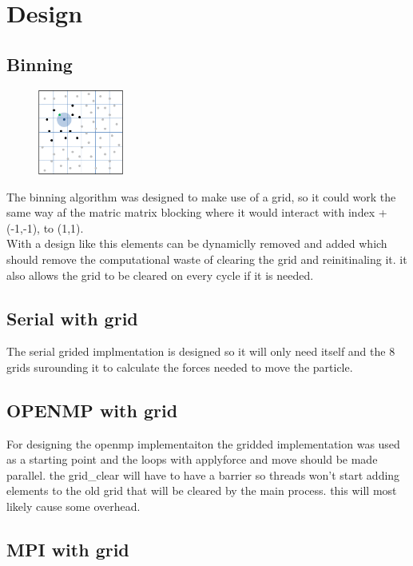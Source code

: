 \documentclass[a4paper,10pt,titlepage]{report}
\begin{document}
\section{Design}

\subsection{Binning}
\begin{figure} %
    \centering
    \includegraphics[width=0.25\textwidth]{grid.png}
\end{figure}
The binning algorithm was designed to make use of a grid, so it could work the same way af the matric matrix blocking where it would interact with index +(-1,-1), to (1,1). \\

With a design like this elements can be dynamiclly removed and added which should remove the computational waste of clearing the grid and reinitinaling it. it also allows the grid to be cleared on every cycle if it is needed. \\

\subsection{Serial with grid}
The serial grided implmentation is designed so it will only need itself and the 8 grids surounding it to calculate the forces needed to move the particle.

\subsection{OPENMP with grid}
For designing the openmp implementaiton the gridded implementation was used as a starting point and the loops with applyforce and move should be made parallel. the grid\_clear will have to have a barrier so threads won't start adding elements to the old grid that will be cleared by the main process. this will most likely cause some overhead.

\subsection{MPI with grid}
\end{document}
